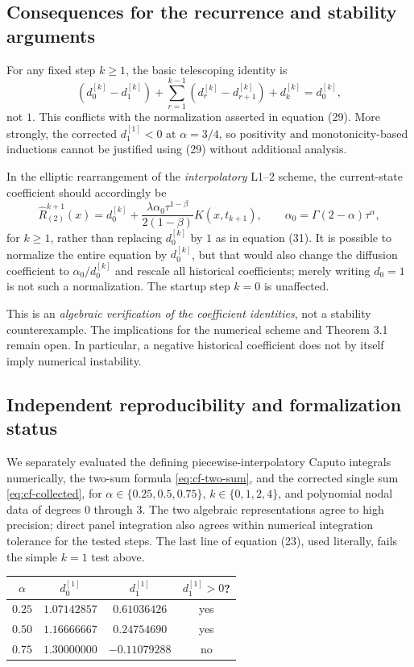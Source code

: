 \documentclass[11pt,a4paper]{amsart}
\theoremstyle{remark}
\theoremstyle{plain}
\theoremstyle{remark}
\numberwithin{equation}{section}
\begin{document}
\subsection{Consequences for the recurrence and stability arguments}
For any fixed step $k\ge1$, the basic telescoping identity is
\begin{equation}\label{eq:cf-telescope}
(d_0^{[k]}-d_1^{[k]})
+\sum_{r=1}^{k-1}(d_r^{[k]}-d_{r+1}^{[k]})+d_k^{[k]}
=d_0^{[k]},
\end{equation}
not $1$. This conflicts with the normalization asserted in equation (29). More strongly, the corrected $d_1^{[1]}<0$ at $\alpha=3/4$, so positivity and monotonicity-based inductions cannot be justified using (29) without additional analysis.

In the elliptic rearrangement of the \emph{interpolatory} L1--2 scheme, the current-state coefficient should accordingly be
\[
 \widehat R_{(2)}^{k+1}(x)
 =d_0^{[k]}+\frac{\lambda\alpha_0\tau^{1-\beta}}{2(1-\beta)}K(x,t_{k+1}),
 \qquad \alpha_0=\Gamma(2-\alpha)\tau^\alpha,
\]
for $k\ge1$, rather than replacing $d_0^{[k]}$ by $1$ as in equation (31). It is possible to normalize the entire equation by $d_0^{[k]}$, but that would also change the diffusion coefficient to $\alpha_0/d_0^{[k]}$ and rescale all historical coefficients; merely writing $d_0=1$ is not such a normalization. The startup step $k=0$ is unaffected.

This is an \emph{algebraic verification of the coefficient identities}, not a stability counterexample. The implications for the numerical scheme and Theorem 3.1 remain open. In particular, a negative historical coefficient does not by itself imply numerical instability.

\subsection{Independent reproducibility and formalization status}
We separately evaluated the defining piecewise-interpolatory Caputo integrals numerically, the two-sum formula \eqref{eq:cf-two-sum}, and the corrected single sum \eqref{eq:cf-collected}, for $\alpha\in\{0.25,0.5,0.75\}$, $k\in\{0,1,2,4\}$, and polynomial nodal data of degrees $0$ through $3$. The two algebraic representations agree to high precision; direct panel integration also agrees within numerical integration tolerance for the tested steps. The last line of equation (23), used literally, fails the simple $k=1$ test above.

\begin{center}
\small
\begin{tabular}{@{}cccc@{}}
\hline
$\alpha$ & $d_0^{[1]}$ & $d_1^{[1]}$ & $d_1^{[1]}>0$?\\
\hline
$0.25$ & $1.07142857$ & $0.61036426$ & yes\\
$0.50$ & $1.16666667$ & $0.24754690$ & yes\\
$0.75$ & $1.30000000$ & $-0.11079288$ & no\\
\hline
\end{tabular}
\end{center}
\end{document}
